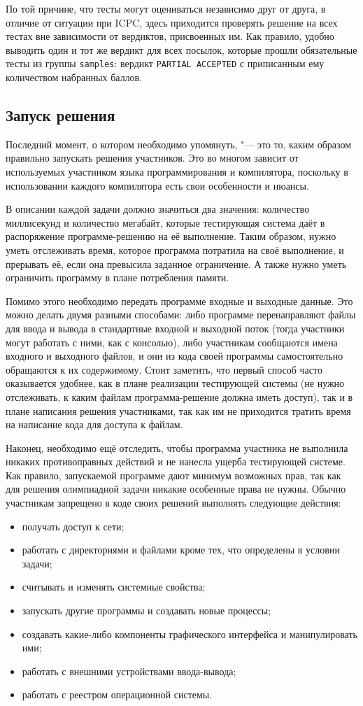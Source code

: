 По той причине, что тесты могут оцениваться независимо друг от друга, в отличие от ситуации при ICPC, здесь приходится проверять решение на всех тестах вне зависимости от вердиктов, присвоенных им. Как правило, удобно выводить один и тот же вердикт для всех посылок, которые прошли обязательные тесты из группы \texttt{samples}: вердикт \texttt{PARTIAL ACCEPTED} с приписанным ему количеством набранных баллов.

\subsection*{Запуск решения}

Последний момент, о котором необходимо упомянуть, "--- это то, каким образом правильно запускать решения участников. Это во многом зависит от используемых участником языка программирования и компилятора, поскольку в использовании каждого компилятора есть свои особенности и нюансы.

В описании каждой задачи должно значиться два значения: количество миллисекунд и количество мегабайт, которые тестирующая система даёт в распоряжение программе-решению на её выполнение. Таким образом, нужно уметь отслеживать время, которое программа потратила на своё выполнение, и прерывать её, если она превысила заданное ограничение. А также нужно уметь ограничить программу в плане потребления памяти.

Помимо этого необходимо передать программе входные и выходные данные. Это можно делать двумя разными способами: либо программе перенаправляют файлы для ввода и вывода в стандартные входной и выходной поток (тогда участники могут работать с ними, как с консолью), либо участникам сообщаются имена входного и выходного файлов, и они из кода своей программы самостоятельно обращаются к их содержимому. Стоит заметить, что первый способ часто оказывается удобнее, как в плане реализации тестирующей системы (не нужно отслеживать, к каким файлам программа-решение должна иметь доступ), так и в плане написания решения участниками, так как им не приходится тратить время на написание кода для доступа к файлам.

Наконец, необходимо ещё отследить, чтобы программа участника не выполнила никаких противоправных действий и не нанесла ущерба тестирующей системе. Как правило, запускаемой программе дают минимум возможных прав, так как для решения олимпиадной задачи никакие особенные права не нужны. Обычно участникам запрещено в коде своих решений выполнять следующие действия:

\begin{itemize}
\item получать доступ к сети;
\item работать с директориями и файлами кроме тех, что определены в условии задачи;
\item считывать и изменять системные свойства;
\item запускать другие программы и создавать новые процессы;
\item создавать какие-либо компоненты графического интерфейса и манипулировать ими;
\item работать с внешними устройствами ввода-вывода;
\item работать с реестром операционной системы.
\end{itemize}